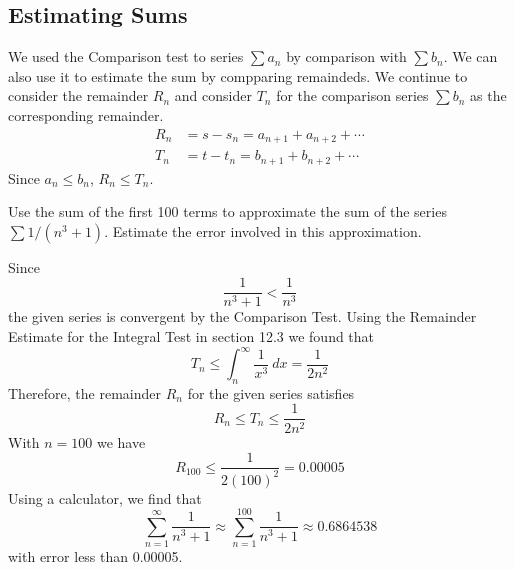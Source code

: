   \subsection*{Estimating Sums}
    We used the Comparison test to series $\sum a_n$ by comparison with $\sum b_n$. We can also use it to estimate the sum by compparing remaindeds. We continue to consider the remainder $R_n$ and consider $T_n$ for the comparison series $\sum b_n$ as the corresponding remainder.
    \begin{align*}
      R_n &= s-s_n = a_{n+1} + a_{n+2} + \cdots \\
      T_n &= t-t_n = b_{n+1} + b_{n+2} + \cdots
    \end{align*}
    Since $a_n \leq b_n$, $R_n \leq T_n$.
    \begin{example}
      Use the sum of the first 100 terms to approximate the sum of the series $\sum 1/(n^3 + 1)$. Estimate the error involved in this approximation.
    \end{example}
    \begin{solution}
      Since $$\frac{1}{n^3+1} < \frac{1}{n^3} $$
      the given series is convergent by the Comparison Test. Using the Remainder Estimate for the Integral Test in section 12.3 we found that $$ T_n \leq \int_{n}^{\infty} \frac{1}{x^3}\ dx = \frac{1}{2n^2} $$
      Therefore, the remainder $R_n$ for the given series satisfies $$R_n \leq T_n \leq \frac{1}{2n^2}$$
      With $n=100$ we have $$ R_{100} \leq \frac{1}{2(100)^2} = 0.00005 $$
      Using a calculator, we find that $$ \sum_{n=1}^{\infty} \frac{1}{n^3+1} \approx \sum_{n=1}^{100} \frac{1}{n^3+1} \approx 0.6864538 $$ with error less than 0.00005.
    \end{solution}